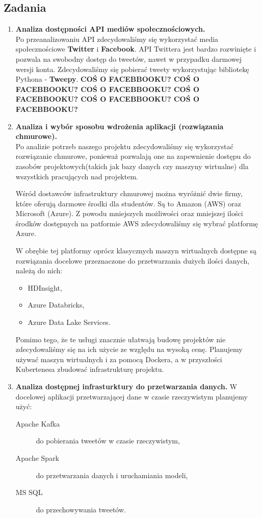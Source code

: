 \documentclass[a4paper,11pt, notitlepage ]{article}
\begin{document}
\subsection{Zadania}
\begin{enumerate}
    \item \textbf{Analiza dostępności API mediów społecznościowych.}\\
    Po przeanalizowaniu API zdecydowaliśmy się wykorzystać media społecznościowe \textbf{Twitter} i \textbf{Facebook}. API Twittera jest bardzo rozwinięte i pozwala na swobodny dostęp do tweetów, nawet w przypadku darmowej wersji konta. Zdecydowaliśmy się pobierać tweety wykorzystując bibliotekę Pythona - \textbf{Tweepy}. \textbf{COŚ O FACEBBOOKU? COŚ O FACEBBOOKU? COŚ O FACEBBOOKU? COŚ O FACEBBOOKU? COŚ O FACEBBOOKU? COŚ O FACEBBOOKU?}
    \item \textbf{Analiza i wybór sposobu wdrożenia aplikacji (rozwiązania chmurowe).} \\
    Po analizie potrzeb naszego projektu zdecydowaliśmy się wykorzystać rozwiązanie chmurowe, ponieważ pozwalają one na zapewnienie dostępu do zasobów projektowych(takich jak bazy danych czy maszyny wirtualne) dla wszystkich pracujących nad projektem.
    
    Wśród dostawców infrastruktury chmurowej można wyróżnić dwie firmy, które oferują darmowe środki dla studentów. Są to Amazon (AWS) oraz Microsoft (Azure). Z powodu mniejszych możliwości oraz mniejszej ilości środków dostępnych na patformie AWS zdecydowaliśmy się wybrać platformę Azure.
    
    W obrębie tej platformy oprócz klasycznych maszyn wirtualnych dostępne są rozwiązania docelowe przeznaczone do przetwarzania dużych ilości danych, należą do nich:
    \begin{itemize}
        \item HDInsight,
        \item Azure Databricks,
        \item Azure Data Lake Services.
    \end{itemize}
    
    Pomimo tego, że te usługi znacznie ułatwają budowę projektów nie zdecydowaliśmy się na ich użycie ze względu na wysoką cenę. Planujemy używać maszyn wirtualnych i za pomocą Dockera, a w przyszłości Kubertenesa zbudować infrastrukturę projektu.

    \item \textbf{Analiza dostępnej infrasturktury do przetwarzania danych.}
    W docelowej aplikacji przetwarzającej dane w czasie rzeczywistym planujemy użyć:
    \begin{description}
        \item[Apache Kafka] do pobierania tweetów w czasie rzeczywistym,
        \item[Apache Spark] do przetwarzania danych i uruchamiania modeli,
        \item[MS SQL] do przechowywania tweetów. 
    \end{description}


\end{enumerate}
\end{document}
